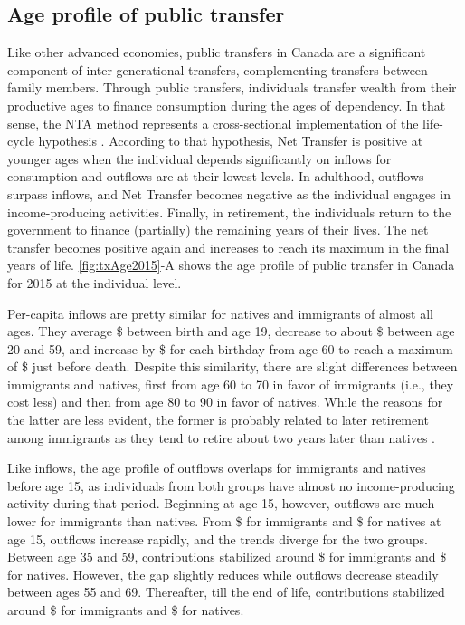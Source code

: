 \subsection{Age profile of public transfer}
Like other advanced economies, public transfers in Canada are a significant component of inter-generational transfers, complementing transfers between family members.
Through public transfers, individuals transfer wealth from their productive ages to finance consumption during the ages of dependency.
In that sense, the NTA method represents a cross-sectional implementation of the life-cycle hypothesis \citep{andoLifeCycleHypothesis1963,Deaton:2005vr}.
According to that hypothesis, Net Transfer is positive at younger ages when the individual depends significantly on inflows for consumption and outflows are at their lowest levels.
In adulthood, outflows surpass inflows, and Net Transfer becomes negative as the individual engages in income-producing activities.
Finally, in retirement, the individuals return to the government to finance (partially) the remaining years of their lives.
The net transfer becomes positive again and increases to reach its maximum in the final years of life. \autoref{fig:txAge2015}-A shows the age profile of public transfer in Canada for 2015 at the individual level.

\vspace{0.7em}\par
Per-capita inflows are pretty similar for natives and immigrants of almost all ages.
They average \$ between birth and age 19, decrease to about \$ between age 20 and 59, and increase by \$ for each birthday from age 60 to reach a maximum of \$ just before death.
Despite this similarity, there are slight differences between immigrants and natives, first from age 60 to 70 in favor of immigrants (i.e., they cost less) and then from age 80 to 90 in favor of natives.
While the reasons for the latter are less evident, the former is probably related to later retirement among immigrants as they tend to retire about two years later than natives \citep[p~284]{statCan:006}.

\vspace{0.7em}\par
Like inflows, the age profile of outflows overlaps for immigrants and natives before age 15, as individuals from both groups have almost no income-producing activity during that period.
Beginning at age 15, however, outflows are much lower for immigrants than natives.
From \$ for immigrants and \$ for natives at age 15, outflows increase rapidly, and the trends diverge for the two groups.
Between age 35 and 59, contributions stabilized around \$ for immigrants and \$ for natives.
However, the gap slightly reduces while outflows decrease steadily between ages 55 and 69.
Thereafter, till the end of life, contributions stabilized around \$ for immigrants and \$ for natives.

